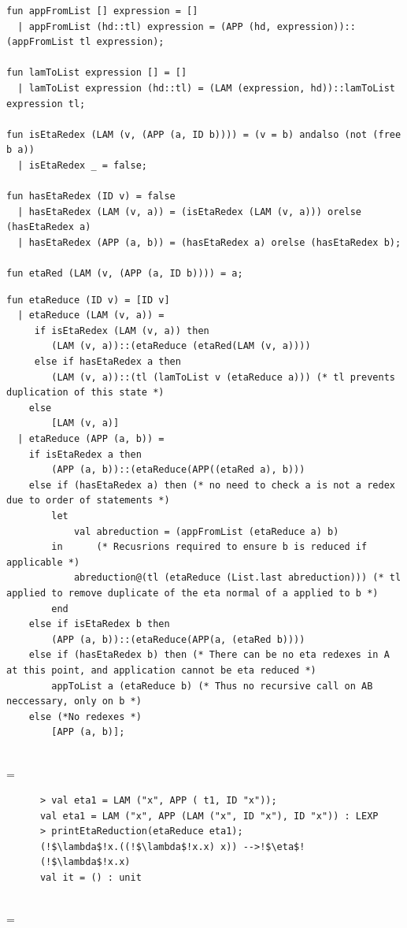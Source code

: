 \documentclass[11pt]{article}
\newenvironment{neverbreak} %
{\par\nobreak\vfil\penalty0\vfilneg
	\vtop\bgroup}
{\par\xdef\tpd{\the\prevdepth}\egroup
	\prevdepth=\tpd}
\begin{document}
\begin{enumerate}
\begin{verbatim}
fun appFromList [] expression = []
  | appFromList (hd::tl) expression = (APP (hd, expression))::(appFromList tl expression);

fun lamToList expression [] = []
  | lamToList expression (hd::tl) = (LAM (expression, hd))::lamToList expression tl;

fun isEtaRedex (LAM (v, (APP (a, ID b)))) = (v = b) andalso (not (free b a))
  | isEtaRedex _ = false;

fun hasEtaRedex (ID v) = false
  | hasEtaRedex (LAM (v, a)) = (isEtaRedex (LAM (v, a))) orelse (hasEtaRedex a)
  | hasEtaRedex (APP (a, b)) = (hasEtaRedex a) orelse (hasEtaRedex b);

fun etaRed (LAM (v, (APP (a, ID b)))) = a;
\end{verbatim}
\begin{neverbreak}
	\begin{verbatim}
fun etaReduce (ID v) = [ID v]
  | etaReduce (LAM (v, a)) =
     if isEtaRedex (LAM (v, a)) then
        (LAM (v, a))::(etaReduce (etaRed(LAM (v, a))))
     else if hasEtaRedex a then
        (LAM (v, a))::(tl (lamToList v (etaReduce a))) (* tl prevents duplication of this state *)
    else
        [LAM (v, a)]
  | etaReduce (APP (a, b)) =
    if isEtaRedex a then
        (APP (a, b))::(etaReduce(APP((etaRed a), b)))
    else if (hasEtaRedex a) then (* no need to check a is not a redex due to order of statements *)
        let
            val abreduction = (appFromList (etaReduce a) b)
        in      (* Recusrions required to ensure b is reduced if applicable *)
            abreduction@(tl (etaReduce (List.last abreduction))) (* tl applied to remove duplicate of the eta normal of a applied to b *)
        end
    else if isEtaRedex b then
        (APP (a, b))::(etaReduce(APP(a, (etaRed b))))
    else if (hasEtaRedex b) then (* There can be no eta redexes in A at this point, and application cannot be eta reduced *)
        appToList a (etaReduce b) (* Thus no recursive call on AB neccessary, only on b *)
    else (*No redexes *)
        [APP (a, b)];
        
        \end{verbatim}
        \end{neverbreak}
    \begin{neverbreak}
        \begin{verbatim}
      > val eta1 = LAM ("x", APP ( t1, ID "x"));
      val eta1 = LAM ("x", APP (LAM ("x", ID "x"), ID "x")) : LEXP
      > printEtaReduction(etaReduce eta1);
      (!$\lambda$!x.((!$\lambda$!x.x) x)) -->!$\eta$!
      (!$\lambda$!x.x)
      val it = () : unit 
      

\end{verbatim}
\end{neverbreak}
\end{enumerate}
\end{document}
